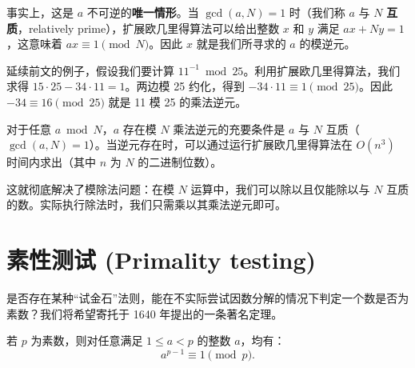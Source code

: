 事实上，这是 $a$ 不可逆的\textbf{唯一情形}。当 $\gcd(a, N) = 1$ 时（我们称 $a$ 与 $N$ \textbf{互质}，relatively prime），扩展欧几里得算法可以给出整数 $x$ 和 $y$ 满足 $ax + Ny = 1$，这意味着 $ax \equiv 1 \pmod N$。因此 $x$ 就是我们所寻求的 $a$ 的模逆元。

\begin{example}
延续前文的例子，假设我们要计算 $11^{-1} \bmod 25$。利用扩展欧几里得算法，我们求得 $15 \cdot 25 - 34 \cdot 11 = 1$。两边模 25 约化，得到 $-34 \cdot 11 \equiv 1 \pmod{25}$。因此 $-34 \equiv 16 \pmod{25}$ 就是 11 模 25 的乘法逆元。
\end{example}

\begin{theorem}
对于任意 $a \bmod N$，$a$ 存在模 $N$ 乘法逆元的充要条件是 $a$ 与 $N$ 互质（$\gcd(a, N) = 1$）。当逆元存在时，可以通过运行扩展欧几里得算法在 $O(n^3)$ 时间内求出（其中 $n$ 为 $N$ 的二进制位数）。
\end{theorem}

这就彻底解决了模除法问题：在模 $N$ 运算中，我们可以除以且仅能除以与 $N$ 互质的数。实际执行除法时，我们只需乘以其乘法逆元即可。

\section{素性测试 (Primality testing)}

是否存在某种“试金石”法则，能在不实际尝试因数分解的情况下判定一个数是否为素数？我们将希望寄托于 1640 年提出的一条著名定理。

\begin{theorem}
若 $p$ 为素数，则对任意满足 $1 \le a < p$ 的整数 $a$，均有：
\[
a^{p-1} \equiv 1 \pmod p.
\]
\end{theorem}

